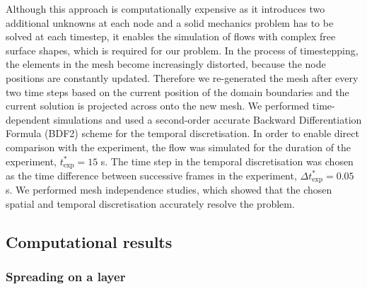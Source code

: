 \documentclass[aip,graphicx]{revtex4-1}
\newcommand{\sym}[1]{\text{#1}} \newcommand{\dif}{\mathrm{d}}
\begin{document}
Although this approach is computationally expensive as it introduces
two additional unknowns at each node and a solid mechanics problem has
to be solved at each timestep, it enables the simulation of flows with
complex free surface shapes, which is required for our problem.  In
the process of timestepping, the elements in the mesh become
increasingly distorted, because the node positions are constantly
updated.  Therefore we re-generated the mesh after every two time
steps based on the current position of the domain boundaries and the
current solution is projected across onto the new mesh.  We performed
time-dependent simulations and used a second-order accurate Backward
Differentiation Formula (BDF2) scheme \cite{sani2000incompressible}
for the temporal discretisation.  In order to enable direct comparison
with the experiment, the flow was simulated for the duration of the
experiment, $t^*_{\sym{exp}}=15$ s.  The time step in the temporal
discretisation was chosen as the time difference between successive
frames in the experiment, $\Delta t^*_{\sym{exp}} = 0.05$ s.  We
performed mesh independence studies, which showed that the chosen
spatial and temporal discretisation accurately resolve the problem.

\subsection{Computational results}

\subsubsection{Spreading on a layer}
\label{sec:comp_spreading_on_layer}
\end{document}
